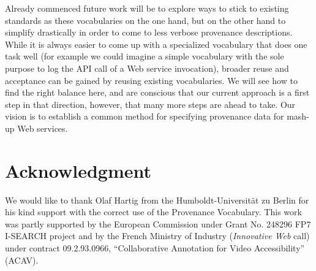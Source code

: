 \documentclass[conference]{IEEEtran}
\begin{document}
Already commenced future work will be to explore ways to stick to existing standards as these vocabularies on the one hand, but on the other hand to simplify drastically in order to come to less verbose provenance descriptions. While it is always easier to come up with a specialized vocabulary that does one task well (for example we could imagine a simple vocabulary with the sole purpose to log the API call of a Web service invocation), broader reuse and acceptance can be gained by reusing existing vocabularies. We will see how to find the right balance here, and are conscious that our current approach is a first step in that direction, however, that many more steps are ahead to take. Our vision is to establish a common method for specifying provenance data for mash-up Web services. 


\section*{Acknowledgment}

We would like to thank Olaf Hartig from the Humboldt-Universit\"{a}t zu Berlin for his kind support with the correct
use of the Provenance Vocabulary. This work was partly supported by the European Commission under Grant No. 248296 FP7
I-SEARCH project and by the French Ministry of Industry (\emph{Innovative Web} call) under contract 09.2.93.0966,
``Collaborative Annotation for Video Accessibility'' (ACAV).




%
%
%



\end{document}

